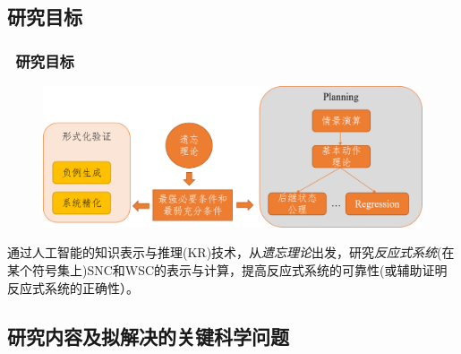 \documentclass[9pt, CJK]{beamer}
\begin{document}
\subsection{研究目标}
	\begin{frame}
		\frametitle{~研究目标}
		\begin{figure}
			\includegraphics[scale=0.3]{figures/mubiao}
		\end{figure}
{\footnotesize	通过人工智能的知识表示与推理(KR)技术，从{\em 遗忘理论}出发，研究{\em 反应式系统}(在某个符号集上)SNC和WSC的表示与计算，提高反应式系统的可靠性(或辅助证明反应式系统的正确性）。
}
	\end{frame}

	
	\subsection{研究内容及拟解决的关键科学问题}
\end{document}
